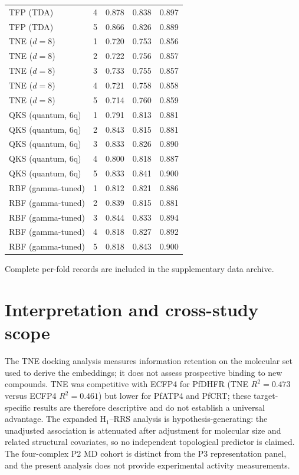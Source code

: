 \documentclass[11pt,a4paper]{article}
\begin{document}
\begin{table}[htbp]
\begin{tabularx}{\textwidth}{l l S[table-format=1.3] S[table-format=1.3] S[table-format=1.3]}
TFP (TDA) & 4 & 0.878 & 0.838 & 0.897 \\
TFP (TDA) & 5 & 0.866 & 0.826 & 0.889 \\
\midrule
TNE ($d=8$) & 1 & 0.720 & 0.753 & 0.856 \\
TNE ($d=8$) & 2 & 0.722 & 0.756 & 0.857 \\
TNE ($d=8$) & 3 & 0.733 & 0.755 & 0.857 \\
TNE ($d=8$) & 4 & 0.721 & 0.758 & 0.858 \\
TNE ($d=8$) & 5 & 0.714 & 0.760 & 0.859 \\
\midrule
QKS (quantum, 6q) & 1 & 0.791 & 0.813 & 0.881 \\
QKS (quantum, 6q) & 2 & 0.843 & 0.815 & 0.881 \\
QKS (quantum, 6q) & 3 & 0.833 & 0.826 & 0.890 \\
QKS (quantum, 6q) & 4 & 0.800 & 0.818 & 0.887 \\
QKS (quantum, 6q) & 5 & 0.833 & 0.841 & 0.900 \\
\midrule
RBF (gamma-tuned) & 1 & 0.812 & 0.821 & 0.886 \\
RBF (gamma-tuned) & 2 & 0.839 & 0.815 & 0.881 \\
RBF (gamma-tuned) & 3 & 0.844 & 0.833 & 0.894 \\
RBF (gamma-tuned) & 4 & 0.818 & 0.827 & 0.892 \\
RBF (gamma-tuned) & 5 & 0.818 & 0.843 & 0.900 \\
\bottomrule
\end{tabularx}
\end{table}

Complete per-fold records are included in the supplementary data archive.

\section{Interpretation and cross-study scope}
\label{sec:interpretation_scope}

The TNE docking analysis measures information retention on the molecular set used to derive the embeddings; it does not assess prospective binding to new compounds. TNE was competitive with ECFP4 for PfDHFR (TNE $R^2 = \num{0.473}$ versus ECFP4 $R^2 = \num{0.461}$) but lower for PfATP4 and PfCRT; these target-specific results are therefore descriptive and do not establish a universal advantage. The expanded H$_1$--RRS analysis is hypothesis-generating: the unadjusted association is attenuated after adjustment for molecular size and related structural covariates, so no independent topological predictor is claimed. The four-complex P2 MD cohort is distinct from the P3 representation panel, and the present analysis does not provide experimental activity measurements.
\end{document}
